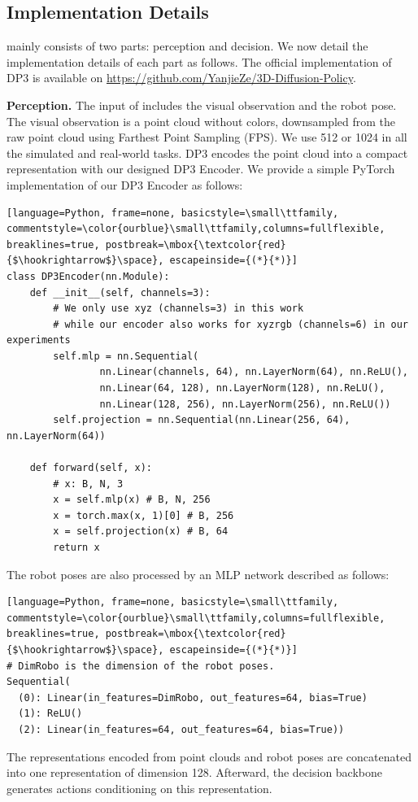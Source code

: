 \clearpage
\newpage
\onecolumn
\begin{appendix}
\subsection{Implementation Details}
\ours mainly consists of two parts: perception and decision. We now detail the implementation details of each part as follows. The official implementation of DP3 is available on \url{https://github.com/YanjieZe/3D-Diffusion-Policy}.

\noindent\textbf{Perception.} The input of \ours includes the visual observation and the robot pose. The visual observation is a point cloud without colors, downsampled from the raw point cloud using Farthest Point Sampling (FPS). We use 512 or 1024 in all the simulated and real-world tasks. DP3 encodes the point cloud into a compact representation with our designed DP3 Encoder. We provide a simple PyTorch implementation of our DP3 Encoder as follows:
\begin{lstlisting}[language=Python, frame=none, basicstyle=\small\ttfamily, commentstyle=\color{ourblue}\small\ttfamily,columns=fullflexible, breaklines=true, postbreak=\mbox{\textcolor{red}{$\hookrightarrow$}\space}, escapeinside={(*}{*)}]
class DP3Encoder(nn.Module):
    def __init__(self, channels=3):
        # We only use xyz (channels=3) in this work
        # while our encoder also works for xyzrgb (channels=6) in our experiments
        self.mlp = nn.Sequential(
                nn.Linear(channels, 64), nn.LayerNorm(64), nn.ReLU(),
                nn.Linear(64, 128), nn.LayerNorm(128), nn.ReLU(),
                nn.Linear(128, 256), nn.LayerNorm(256), nn.ReLU())
        self.projection = nn.Sequential(nn.Linear(256, 64), nn.LayerNorm(64))
    
    def forward(self, x):
        # x: B, N, 3
        x = self.mlp(x) # B, N, 256
        x = torch.max(x, 1)[0] # B, 256
        x = self.projection(x) # B, 64
        return x
\end{lstlisting}
The robot poses are also processed by an MLP network described as follows:
\begin{lstlisting}[language=Python, frame=none, basicstyle=\small\ttfamily, commentstyle=\color{ourblue}\small\ttfamily,columns=fullflexible, breaklines=true, postbreak=\mbox{\textcolor{red}{$\hookrightarrow$}\space}, escapeinside={(*}{*)}]
# DimRobo is the dimension of the robot poses.
Sequential(
  (0): Linear(in_features=DimRobo, out_features=64, bias=True)
  (1): ReLU()
  (2): Linear(in_features=64, out_features=64, bias=True))
\end{lstlisting}
The representations encoded from point clouds and robot poses are concatenated into one representation of dimension 128.  Afterward, the decision backbone generates actions conditioning on this representation.


\end{appendix}

